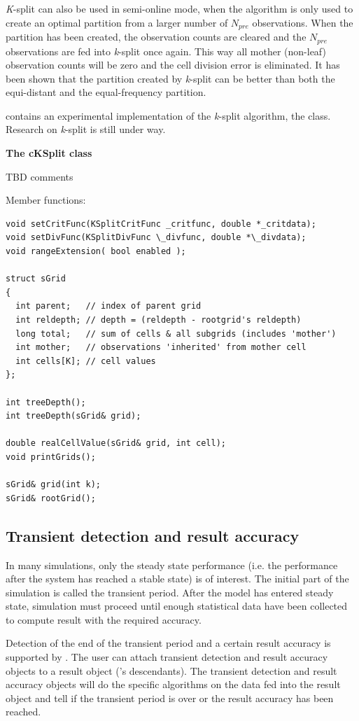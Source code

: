 \textit{K}-split can also be used in semi-online mode, when the
algorithm is only used to create an optimal partition from a larger
number of $N_{pre}$ observations. When the partition has been created,
the observation counts are cleared and the $N_{pre}$ observations are
fed into \textit{k}-split once again. This way all mother (non-leaf)
observation counts will be zero and the cell division error is
eliminated. It has been shown that the partition created by
\textit{k}-split can be better than both the equi-distant and the
equal-frequency partition.


{\opp} contains an experimental implementation of the \textit{k}-split
algorithm, the  class. Research on \textit{k}-split is
still under way.


\textbf{The cKSplit class}


TBD comments

Member functions:
\begin{Verbatim}
void setCritFunc(KSplitCritFunc _critfunc, double *_critdata);
void setDivFunc(KSplitDivFunc \_divfunc, double *\_divdata);
void rangeExtension( bool enabled );

struct sGrid
{
  int parent;   // index of parent grid
  int reldepth; // depth = (reldepth - rootgrid's reldepth)
  long total;   // sum of cells & all subgrids (includes 'mother')
  int mother;   // observations 'inherited' from mother cell
  int cells[K]; // cell values
};

int treeDepth();
int treeDepth(sGrid& grid);

double realCellValue(sGrid& grid, int cell);
void printGrids();

sGrid& grid(int k);
sGrid& rootGrid();
\end{Verbatim}



\subsection{Transient detection and result accuracy}

In many simulations, only the steady state performance (i.e. 
the performance after the system has reached a stable state) 
is of interest. The initial part of the simulation is called 
the transient period. After the model has entered steady state, 
simulation must proceed until enough statistical data have been 
collected to compute result with the required accuracy.


Detection of the end of the transient period and a certain result
accuracy is supported by {\opp}. The user can attach transient
detection and result accuracy objects to a result object ('s
descendants). The transient detection and result accuracy objects will
do the specific algorithms on the data fed into the result object and
tell if the transient period is over or the result accuracy has been
reached.

